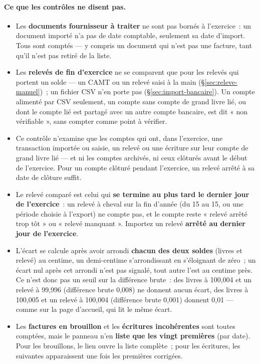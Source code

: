 \documentclass[a4paper,11pt,oneside]{article}
\begin{document}
\paragraph{Ce que les contrôles ne disent pas.}
\begin{itemize}
    \item Les \textbf{documents fournisseur à traiter} ne sont pas bornés à l'exercice~: un document importé n'a pas de date comptable, seulement sa date d'import. Tous sont comptés --- y compris un document qui n'est pas une facture, tant qu'il n'est pas retiré de la liste.
    \item Les \textbf{relevés de fin d'exercice} ne se comparent que pour les relevés qui portent un solde --- un CAMT ou un relevé saisi à la main (\S\ref{sec:releve-manuel})~; un fichier CSV n'en porte pas (\S\ref{sec:import-bancaire}). Un compte alimenté par CSV seulement, un compte sans compte de grand livre lié, ou dont le compte lié est partagé avec un autre compte bancaire, est dit « non vérifiable », sans compter comme point à vérifier.
    \item Ce contrôle n'examine que les comptes qui ont, dans l'exercice, une transaction importée ou saisie, un relevé ou une écriture sur leur compte de grand livre lié --- et ni les comptes archivés, ni ceux clôturés avant le début de l'exercice. Pour un compte clôturé pendant l'exercice, un relevé arrêté à sa date de clôture suffit.
    \item Le relevé comparé est celui qui \textbf{se termine au plus tard le dernier jour de l'exercice}~: un relevé à cheval sur la fin d'année (du 15 au 15, ou une période choisie à l'export) ne compte pas, et le compte reste « relevé arrêté trop tôt » ou « relevé manquant ». Importez un relevé \textbf{arrêté au dernier jour de l'exercice}.
    \item L'écart se calcule après avoir arrondi \textbf{chacun des deux soldes} (livres et relevé) au centime, un demi-centime s'arrondissant en s'éloignant de zéro~; un écart nul après cet arrondi n'est pas signalé, tout autre l'est au centime près. Ce n'est donc pas un seuil sur la différence brute~: des livres à 100,004 et un relevé à 99,996 (différence brute 0,008) ne donnent aucun écart, des livres à 100,005 et un relevé à 100,004 (différence brute 0,001) donnent 0,01 --- comme sur la page d'accueil, qui lit le même écart.
    \item Les \textbf{factures en brouillon} et les \textbf{écritures incohérentes} sont toutes comptées, mais le panneau n'en \textbf{liste que les vingt premières} (par date). Pour les brouillons, le lien ouvre la liste complète~; pour les écritures, les suivantes apparaissent une fois les premières corrigées.

\end{itemize}
\end{document}
